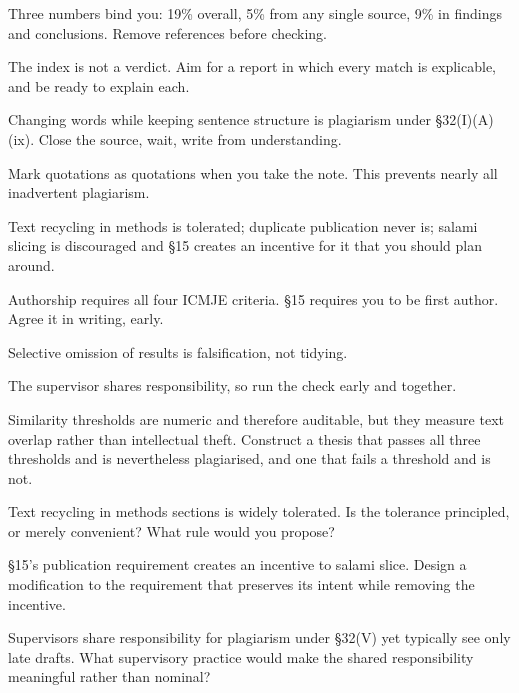\begin{chaptersummary}
\begin{tight}
  \item Three numbers bind you: 19\% overall, 5\% from any single source, 9\% in
    findings and conclusions. Remove references before checking.
  \item The index is not a verdict. Aim for a report in which every match is
    explicable, and be ready to explain each.
  \item Changing words while keeping sentence structure is plagiarism under
    \S32(I)(A)(ix). Close the source, wait, write from understanding.
  \item Mark quotations as quotations when you take the note. This prevents
    nearly all inadvertent plagiarism.
  \item Text recycling in methods is tolerated; duplicate publication never is;
    salami slicing is discouraged and \S15 creates an incentive for it that you
    should plan around.
  \item Authorship requires all four ICMJE criteria. \S15 requires you to be
    first author. Agree it in writing, early.
  \item Selective omission of results is falsification, not tidying.
  \item The supervisor shares responsibility, so run the check early and
    together.
\end{tight}
\end{chaptersummary}

\begin{reviewq}
  \item Similarity thresholds are numeric and therefore auditable, but they
    measure text overlap rather than intellectual theft. Construct a thesis
    that passes all three thresholds and is nevertheless plagiarised, and one
    that fails a threshold and is not.
  \item Text recycling in methods sections is widely tolerated. Is the
    tolerance principled, or merely convenient? What rule would you propose?
  \item \S15's publication requirement creates an incentive to salami slice.
    Design a modification to the requirement that preserves its intent while
    removing the incentive.
  \item Supervisors share responsibility for plagiarism under \S32(V) yet
    typically see only late drafts. What supervisory practice would make the
    shared responsibility meaningful rather than nominal?
\end{reviewq}
